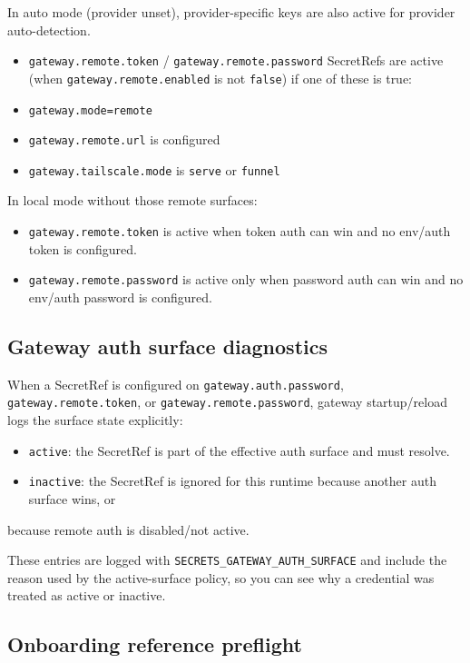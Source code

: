 In auto mode (provider unset), provider-specific keys are also active for provider auto-detection.
\begin{itemize}
  \item \texttt{gateway.remote.token} / \texttt{gateway.remote.password} SecretRefs are active (when \texttt{gateway.remote.enabled} is not \texttt{false}) if one of these is true:
  \item \texttt{gateway.mode=remote}
  \item \texttt{gateway.remote.url} is configured
  \item \texttt{gateway.tailscale.mode} is \texttt{serve} or \texttt{funnel}
\end{itemize}

In local mode without those remote surfaces:
\begin{itemize}
  \item \texttt{gateway.remote.token} is active when token auth can win and no env/auth token is configured.
  \item \texttt{gateway.remote.password} is active only when password auth can win and no env/auth password is configured.
\end{itemize}


\subsection{Gateway auth surface diagnostics}


When a SecretRef is configured on \texttt{gateway.auth.password}, \texttt{gateway.remote.token}, or
\texttt{gateway.remote.password}, gateway startup/reload logs the surface state explicitly:

\begin{itemize}
  \item \texttt{active}: the SecretRef is part of the effective auth surface and must resolve.
  \item \texttt{inactive}: the SecretRef is ignored for this runtime because another auth surface wins, or
\end{itemize}

because remote auth is disabled/not active.

These entries are logged with \texttt{SECRETS\_GATEWAY\_AUTH\_SURFACE} and include the reason used by the
active-surface policy, so you can see why a credential was treated as active or inactive.

\subsection{Onboarding reference preflight}


